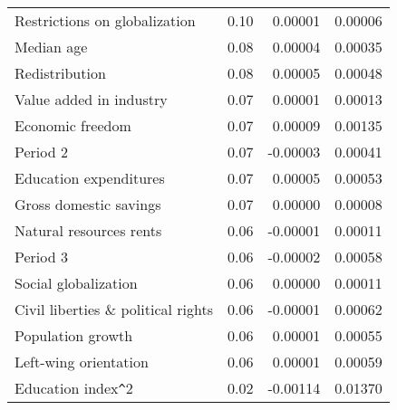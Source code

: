 \documentclass[a4paper,11pt]{article}
\begin{document}
\begin{table}[!ht]
\begin{tabular}{lrrr}
      Restrictions on globalization & 0.10 & 0.00001 & 0.00006 \\ 
      Median age & 0.08 & 0.00004 & 0.00035 \\ 
      Redistribution & 0.08 & 0.00005 & 0.00048 \\
      Value added in industry & 0.07 & 0.00001 & 0.00013 \\ 
      Economic freedom & 0.07 & 0.00009 & 0.00135 \\ 
      Period 2 & 0.07 & -0.00003 & 0.00041 \\
      Education expenditures & 0.07 & 0.00005 & 0.00053 \\
      Gross domestic savings & 0.07 & 0.00000 & 0.00008 \\
      Natural resources rents & 0.06 & -0.00001 & 0.00011 \\
      Period 3 & 0.06 & -0.00002 & 0.00058 \\
      Social globalization & 0.06 & 0.00000 & 0.00011 \\ 
      Civil liberties \& political rights & 0.06 & -0.00001 & 0.00062 \\ 
      Population growth & 0.06 & 0.00001 & 0.00055 \\ 
      Left-wing orientation & 0.06 & 0.00001 & 0.00059 \\ 
      Education index\verb|^|2 & 0.02 & -0.00114 & 0.01370 \\ 
    \end{tabular}
    \end{table}
\end{document}
